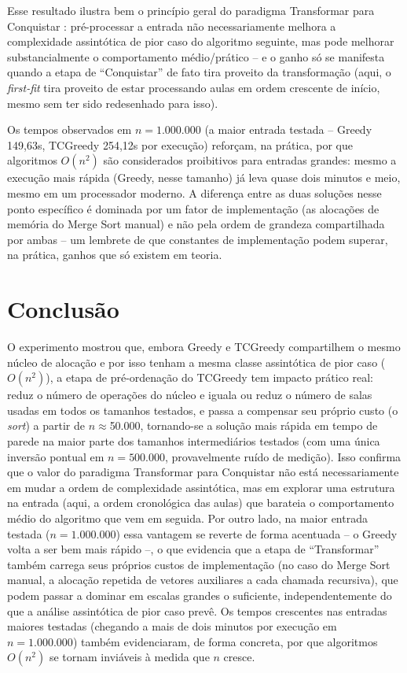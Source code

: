 \documentclass[12pt]{article}
\begin{document}
Esse resultado ilustra bem o princípio geral do paradigma Transformar
para Conquistar \cite{levitin:11}: pré-processar a entrada não
necessariamente melhora a complexidade assintótica de pior caso do
algoritmo seguinte, mas pode melhorar substancialmente o comportamento
médio/prático -- e o ganho só se manifesta quando a etapa de
``Conquistar'' de fato tira proveito da transformação (aqui, o
\textit{first-fit} tira proveito de estar processando aulas em ordem
crescente de início, mesmo sem ter sido redesenhado para isso).

Os tempos observados em $n=1.000.000$ (a maior entrada testada -- Greedy
149,63s, TCGreedy 254,12s por execução) reforçam, na prática, por que
algoritmos $O(n^2)$ \cite{cormen:09} são considerados proibitivos para
entradas grandes: mesmo a execução mais rápida (Greedy, nesse tamanho) já
leva quase dois minutos e meio, mesmo em um processador moderno. A
diferença entre as duas soluções nesse ponto específico é dominada por um
fator de implementação (as alocações de memória do Merge Sort manual) e
não pela ordem de grandeza compartilhada por ambas -- um lembrete de que
constantes de implementação podem superar, na prática, ganhos que só
existem em teoria.

\section{Conclusão}

O experimento mostrou que, embora Greedy e TCGreedy compartilhem o mesmo
núcleo de alocação e por isso tenham a mesma classe assintótica de pior
caso ($O(n^2)$), a etapa de pré-ordenação do TCGreedy tem impacto prático
real: reduz o número de operações do núcleo e iguala ou reduz o número de
salas usadas em todos os tamanhos testados, e passa a compensar seu
próprio custo (o \textit{sort}) a partir de $n\approx$50.000, tornando-se
a solução mais rápida em tempo de parede na maior parte dos tamanhos
intermediários testados (com uma única inversão pontual em $n=500.000$,
provavelmente ruído de medição). Isso confirma que o valor do paradigma
Transformar para Conquistar não está necessariamente em mudar a ordem de
complexidade assintótica, mas em explorar uma estrutura na entrada (aqui,
a ordem cronológica das aulas) que barateia o comportamento médio do
algoritmo que vem em seguida. Por outro lado, na maior entrada testada
($n=1.000.000$) essa vantagem se reverte de forma acentuada -- o Greedy
volta a ser bem mais rápido --, o que evidencia que a etapa de
``Transformar'' também carrega seus próprios custos de implementação (no
caso do Merge Sort manual, a alocação repetida de vetores auxiliares a
cada chamada recursiva), que podem passar a dominar em escalas grandes o
suficiente, independentemente do que a análise assintótica de pior caso
prevê. Os tempos crescentes nas entradas maiores testadas (chegando a
mais de dois minutos por execução em $n=1.000.000$) também evidenciaram,
de forma concreta, por que algoritmos $O(n^2)$ se tornam inviáveis à
medida que $n$ cresce.
\end{document}
